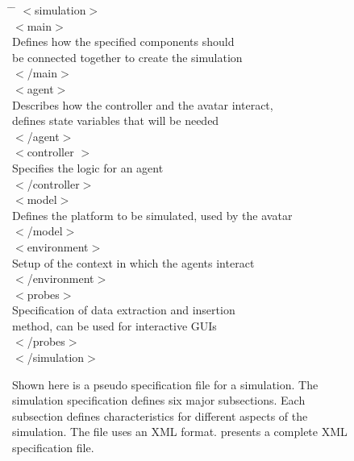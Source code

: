 \begin{figure}[ht]
  \centering
  \begin{minipage}{5in}
    \centering
    \ttfamily
    \small
    \begin{tabbing}
      \hspace{4ex} \= \hspace{4ex} \= \kill
      $<$simulation$>$ \\
      \> $<$main$>$ \\
      \> \> \textnormal{Defines how the specified components should}    \\ 
      \> \> \textnormal{be connected together to create the simulation }\\
      \> $<$/main$>$ \\
      
      \> $<$agent$>$ \\
      \> \> \textnormal{Describes how the controller and the avatar interact,} \\
      \> \> \textnormal{defines state variables that will be needed} \\
      \> $<$/agent$>$ \\
      
      \> $<$controller $>$ \\
      \> \> \textnormal{Specifies the logic for an agent} \\
      \> $<$/controller$>$ \\
      
      \> $<$model$>$ \\
      \> \> \textnormal{Defines the platform to be simulated, used by the avatar} \\
      \> $<$/model$>$ \\
      
      \> $<$environment$>$ \\
      \> \> \textnormal{Setup of the context in which the agents interact} \\
      \> $<$/environment$>$ \\
      
      \> $<$probes$>$ \\
      \> \> \textnormal{Specification of data extraction and insertion} \\
      \> \> \textnormal{method, can be used for interactive GUIs} \\
      \> $<$/probes$>$ \\
      $<$/simulation$>$ \\
    \end{tabbing}
    \rmfamily
    \caption[A pseudo specification file for a \SWEEP{} simulation.]{Shown here is a pseudo specification file for a \SWEEP{} simulation.  The \SWEEP{} simulation specification defines six major subsections.  Each subsection defines characteristics for different aspects of the simulation.  The file uses an XML format.   presents a complete \SWEEP{} XML specification file.}
    
  \end{minipage}
  
  \label{fig:XMLconfig}
\end{figure}


